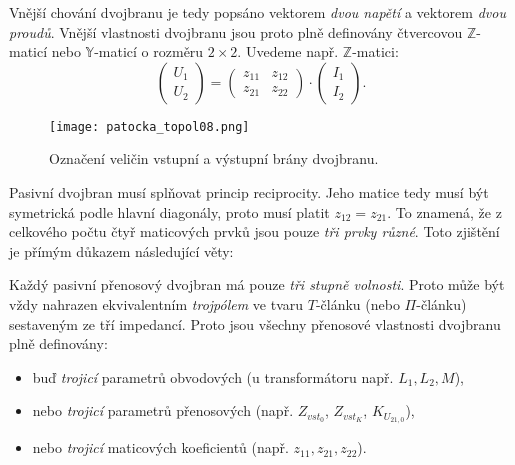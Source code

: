       Vnější chování dvojbranu je tedy popsáno vektorem \emph{dvou napětí} a vektorem \emph{dvou 
      proudů}. Vnější vlastnosti dvojbranu jsou proto plně definovány čtvercovou 
      \(\mathbb{Z}\)-maticí nebo  \(\mathbb{Y}\)-maticí o rozměru \(2\times2\). Uvedeme např. 
      \(\mathbb{Z}\)-matici:
      \begin{equation}\label{ES:eq_topol09}
        \left(
          \begin{array}{c}
            U_1 \\ U_2   
           \end{array}
        \right)
        =
        \left(
        \begin{array}{cc}
          z_{11}    &  z_{12}   \\
          z_{21}    &  z_{22}   
        \end{array}
        \right)
        \cdot
        \left(
          \begin{array}{c}
            I_1 \\ I_2 
          \end{array}
        \right).         
      \end{equation}
      
      \begin{figure}[ht!]
        \centering  
        \texttt{[image: patocka\_topol08.png]}
        \caption{Označení veličin vstupní a výstupní brány dvojbranu. \cite[s.~49]{Patocka4}} 
        \label{es:fig_patocka_topol08}
      \end{figure}
      
      Pasivní dvojbran musí splňovat princip reciprocity. Jeho matice tedy musí být symetrická 
      podle hlavní diagonály, proto musí platit \(z_{12} = z_{21}\). To znamená, že z celkového 
      počtu čtyř maticových prvků jsou pouze \emph{tři prvky různé}. Toto zjištění je přímým 
      důkazem následující věty:
      \begin{lemma}\label{ES:lem_topol02}
         Každý pasivní přenosový dvojbran má pouze \emph{tři stupně volnosti}. Proto může být vždy 
         nahrazen ekvivalentním \emph{trojpólem} ve tvaru \(T\)-článku (nebo \(\Pi\)-článku) 
         sestaveným ze tří impedancí. Proto jsou všechny přenosové vlastnosti dvojbranu plně 
         definovány:
         \begin{itemize}[noitemsep]
            \item buď \emph{trojicí} parametrů obvodových (u transformátoru např. \(L_1, L_2, M\)),
            \item nebo \emph{trojicí} parametrů přenosových (např. \(Z_{vst_0}\), \(Z_{vst_K}\),    
                  \(K_{U_{21,0}}\)),
            \item nebo \emph{trojicí} maticových koeficientů (např. \(z_{11}, z_{21}, z_{22}\)).
          \end{itemize}
      \end{lemma}
      
